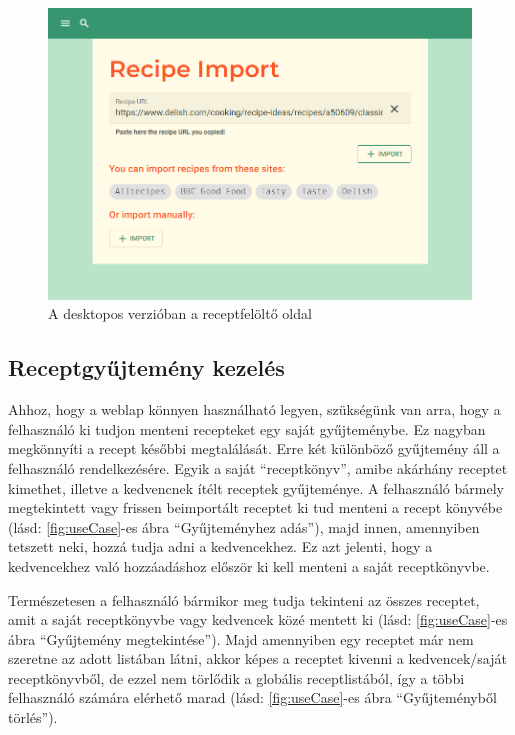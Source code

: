 \documentclass[12pt]{report}
\theoremstyle{definition}
\begin{document}
\begin{figure}[H]%
    \centering
    \includegraphics[width=11.5cm]{pictures/web_import.png}
	\caption{A desktopos verzióban a receptfelöltő oldal}%
    \label{fig:importPage}%
\end{figure}


\subsection{Receptgyűjtemény kezelés}
Ahhoz, hogy a weblap könnyen használható legyen, szükségünk van arra, hogy a felhasználó ki tudjon menteni recepteket egy saját gyűjteménybe. Ez nagyban megkönnyíti a recept későbbi megtalálását. Erre két különböző gyűjtemény áll a felhasználó rendelkezésére. Egyik a saját “receptkönyv”, amibe akárhány receptet kimethet, illetve a kedvencnek ítélt receptek gyűjteménye. A felhasználó bármely megtekintett vagy frissen beimportált receptet ki tud menteni a recept könyvébe (lásd: \ref{fig:useCase}-es ábra “Gyűjteményhez adás”), majd innen, amennyiben tetszett neki, hozzá tudja adni a kedvencekhez. Ez azt jelenti, hogy a kedvencekhez való hozzáadáshoz először ki kell menteni  a saját receptkönyvbe.

Természetesen a felhasználó bármikor meg tudja tekinteni az összes receptet, amit a saját receptkönyvbe vagy kedvencek közé mentett ki (lásd: \ref{fig:useCase}-es ábra “Gyűjtemény megtekintése”). Majd amennyiben egy receptet már nem szeretne az adott listában látni, akkor képes a receptet kivenni a kedvencek/saját receptkönyvből, de ezzel nem törlődik a globális receptlistából, így a többi felhasználó számára elérhető marad (lásd: \ref{fig:useCase}-es ábra “Gyűjteményből törlés”). 
\end{document}
